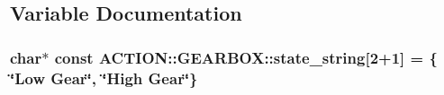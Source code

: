 \subsection{\-Variable \-Documentation}
\hypertarget{namespace_a_c_t_i_o_n_1_1_g_e_a_r_b_o_x_a2bee88f7e4a506d457c2e532d5e92aa8}{
\subsubsection[{state\-\_\-string}]{\setlength{\rightskip}{0pt plus 5cm}char$\ast$ const {\bf \-A\-C\-T\-I\-O\-N\-::\-G\-E\-A\-R\-B\-O\-X\-::state\-\_\-string}\mbox{[}2+1\mbox{]} = \{ \char`\"{}\-Low \-Gear\char`\"{}, \char`\"{}\-High \-Gear\char`\"{}\}}}
\label{namespace_a_c_t_i_o_n_1_1_g_e_a_r_b_o_x_a2bee88f7e4a506d457c2e532d5e92aa8}
